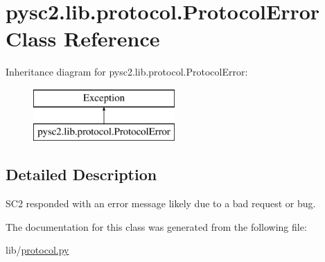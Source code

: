 \hypertarget{classpysc2_1_1lib_1_1protocol_1_1_protocol_error}{}\section{pysc2.\+lib.\+protocol.\+Protocol\+Error Class Reference}
\label{classpysc2_1_1lib_1_1protocol_1_1_protocol_error}
Inheritance diagram for pysc2.\+lib.\+protocol.\+Protocol\+Error\+:\begin{figure}[H]
\begin{center}
\leavevmode
\includegraphics[height=2.000000cm]{classpysc2_1_1lib_1_1protocol_1_1_protocol_error}
\end{center}
\end{figure}


\subsection{Detailed Description}
\begin{DoxyVerb}SC2 responded with an error message likely due to a bad request or bug.\end{DoxyVerb}
 

The documentation for this class was generated from the following file\+:\begin{DoxyCompactItemize}
\item 
lib/\mbox{\hyperlink{protocol_8py}{protocol.\+py}}\end{DoxyCompactItemize}
